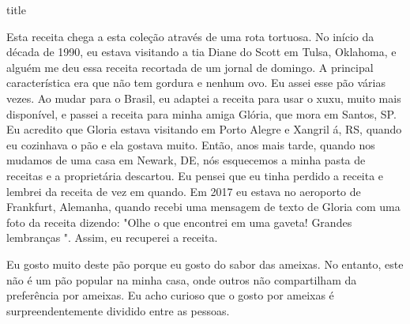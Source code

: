\documentclass [11pt, letterpaper] {article}
\begin{document}
 {title}

Esta receita chega a esta coleção através de uma rota tortuosa. No
início da década de 1990, eu estava visitando a tia Diane do Scott em
Tulsa, Oklahoma, e alguém me deu essa receita recortada de um jornal
de domingo. A principal característica era que não tem gordura e
nenhum ovo. Eu assei esse pão várias vezes. Ao mudar para o Brasil, eu
adaptei a receita para usar o xuxu, muito mais disponível, e passei a receita para minha amiga Gl\'oria, que mora em Santos, SP.
Eu acredito que Gloria estava visitando em Porto Alegre e Xangril \'a,
RS, quando eu cozinhava o pão e ela gostava muito. Então, anos mais
tarde, quando nos mudamos de uma casa em Newark, DE, nós esquecemos a
minha pasta de receitas e a proprietária descartou. Eu pensei que eu
tinha perdido a receita e lembrei da receita de vez em quando. Em 2017 eu estava no aeroporto de Frankfurt, Alemanha, quando recebi uma mensagem de texto de Gloria com uma foto da receita dizendo: "Olhe o que encontrei em uma gaveta! Grandes lembranças ". Assim, eu recuperei a receita.

Eu gosto muito deste pão porque eu gosto do sabor das ameixas. No
 entanto, este não é um pão popular na minha casa, onde outros não
 compartilham da prefer\^encia por ameixas. Eu acho curioso que o gosto por ameixas \'e surpreendentemente dividido entre as pessoas. 
\end{document}

